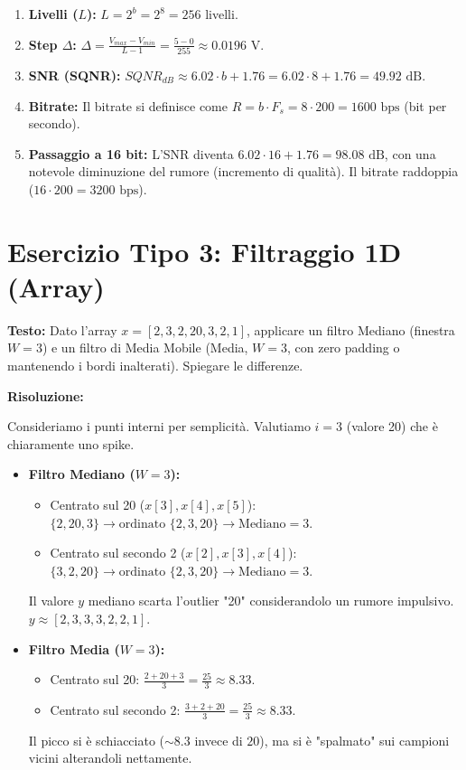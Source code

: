\begin{enumerate}
    \item \textbf{Livelli ($L$):} $L = 2^b = 2^8 = 256$ livelli.
    \item \textbf{Step $\Delta$:} $\Delta = \frac{V_{max} - V_{min}}{L - 1} = \frac{5 - 0}{255} \approx 0.0196 \text{ V}$.
    \item \textbf{SNR (SQNR):} $SQNR_{dB} \approx 6.02 \cdot b + 1.76 = 6.02 \cdot 8 + 1.76 = 49.92 \text{ dB}$.
    \item \textbf{Bitrate:} Il bitrate si definisce come $R = b \cdot F_s = 8 \cdot 200 = 1600 \text{ bps}$ (bit per secondo).
    \item \textbf{Passaggio a 16 bit:} L'SNR diventa $6.02 \cdot 16 + 1.76 = 98.08 \text{ dB}$, con una notevole diminuzione del rumore (incremento di qualità).
    Il bitrate raddoppia ($16 \cdot 200 = 3200 \text{ bps}$).
\end{enumerate}

\section{Esercizio Tipo 3: Filtraggio 1D (Array)}
\textbf{Testo:} Dato l'array $x = [2, 3, 2, 20, 3, 2, 1]$, applicare un filtro Mediano (finestra $W=3$) e un filtro di Media Mobile (Media, $W=3$, con zero padding o mantenendo i bordi inalterati).
Spiegare le differenze.

\vspace{0.5cm}
\textbf{Risoluzione:}

Consideriamo i punti interni per semplicità.
Valutiamo $i=3$ (valore 20) che è chiaramente uno spike.

\begin{itemize}
    \item \textbf{Filtro Mediano ($W=3$):}
    \begin{itemize}
        \item Centrato sul 20 ($x[3], x[4], x[5]$): $\{2, 20, 3\} \rightarrow \text{ordinato } \{2, 3, 20\} \rightarrow \text{Mediano} = 3$.
        \item Centrato sul secondo 2 ($x[2], x[3], x[4]$): $\{3, 2, 20\} \rightarrow \text{ordinato } \{2, 3, 20\} \rightarrow \text{Mediano} = 3$.
    \end{itemize}
    Il valore $y$ mediano scarta l'outlier "20" considerandolo un rumore impulsivo. $y \approx[2, 3, 3, 3, 2, 2, 1]$.

    \item \textbf{Filtro Media ($W=3$):}
    \begin{itemize}
        \item Centrato sul 20: $\frac{2 + 20 + 3}{3} = \frac{25}{3} \approx 8.33$.
        \item Centrato sul secondo 2: $\frac{3 + 2 + 20}{3} = \frac{25}{3} \approx 8.33$.
    \end{itemize}
    Il picco si è schiacciato ($\sim 8.3$ invece di $20$), ma si è "spalmato" sui campioni vicini alterandoli nettamente.
\end{itemize}

